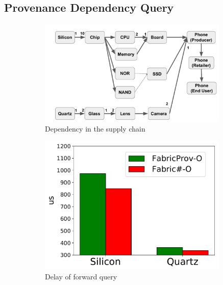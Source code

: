 \subsection{Provenance Dependency Query}
\begin{figure}[t]
	\centering
    \begin{subfigure}{0.68\textwidth}
      \includegraphics[width=0.99\textwidth]{diagram/provenance/supplychain.pdf}
      \caption{Dependency in the supply chain}
      \label{diagram:provenance:supply_chain_dag}
    \end{subfigure}
    \begin{subfigure}{0.45\textwidth}
      \includegraphics[width=0.99\textwidth]{chart/provenance/forward.pdf}
      \caption{Delay of forward query}
      \label{chart:provenance:supply_chain_forward}
    \end{subfigure}
    \begin{subfigure}{0.45\textwidth}

\end{subfigure}
\end{figure}
